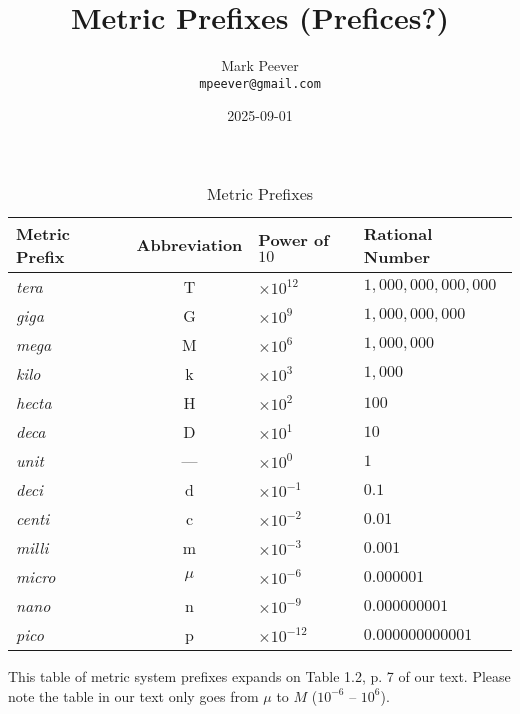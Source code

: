 \documentclass[11pt, oneside]{article}   	%
\title{Metric Prefixes (Prefices?)}
\author{Mark Peever\\ \texttt{mpeever@gmail.com}}
\date{2025-09-01}							%
\begin{document}
\maketitle



\begin{table}[h]
\centering
\begin{tabular}[b]{ l | c | l  | l}
\hline
Metric Prefix   & Abbreviation & Power of $10$ & Rational Number \\
\hline
\emph{tera}     & T             & $ \times 10^{12} $  & $ 1,000,000,000,000 $ \\
\emph{giga}    & G             & $ \times 10^{9} $   & $ 1,000,000,000 $   \\
\hline
\emph{mega}  & M            & $ \times 10^{6} $   & $ 1,000,000 $   \\
\emph{kilo}      & k             & $ \times 10^{3} $   & $ 1,000 $   \\
\emph{hecta}   & H            & $ \times 10^{2} $   & $ 100 $   \\
\emph{deca}    & D            & $ \times 10^{1} $   & $ 10 $   \\
\emph{unit}      & ---           & $\times 10^{0} $    & $ 1 $ \\
\emph{deci}     & d            & $ \times 10^{-1} $  & $ 0.1 $   \\
\emph{centi}    & c            & $ \times 10^{-2} $  & $ 0.01 $   \\
\emph{milli}      & m          & $ \times 10^{-3} $  & $ 0.001 $  \\
\emph{micro}   & $\mu$   & $ \times 10^{-6} $  & $ 0.000001 $  \\
\hline
\emph{nano}    & n           & $ \times 10^{-9} $  & $ 0.000000001 $  \\
\emph{pico}     & p           & $ \times 10^{-12} $  & $ 0.000000000001 $  \\
\end{tabular}
\caption{Metric Prefixes}
\label{table:mprefixes}
\end{table}

This table of metric system prefixes expands on Table 1.2, p. 7 of our text.
Please note the table in our text only goes from $\mu$ to $M$ ($10^{-6}$ -- $10^{6}$).
\end{document}
